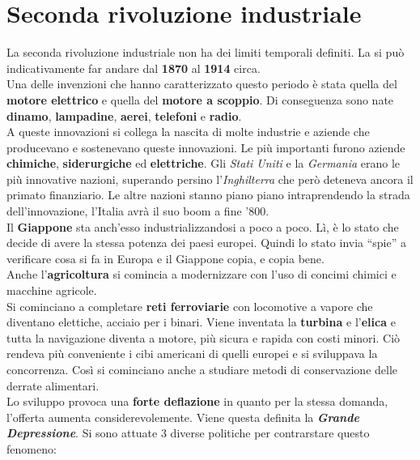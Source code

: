 
\section{Seconda rivoluzione industriale}
La seconda rivoluzione industriale non ha dei limiti temporali definiti. La si può indicativamente
far andare dal \textbf{1870} al \textbf{1914} circa.\\
Una delle invenzioni che hanno caratterizzato questo periodo è stata quella del \textbf{motore
elettrico} e quella del \textbf{motore a scoppio}. Di conseguenza sono nate \textbf{dinamo},
\textbf{lampadine}, \textbf{aerei}, \textbf{telefoni} e \textbf{radio}.\\
A queste innovazioni si collega la nascita di molte industrie e aziende che producevano e sostenevano
queste innovazioni. Le più importanti furono aziende \textbf{chimiche}, \textbf{siderurgiche} ed
\textbf{elettriche}. Gli \emph{Stati Uniti} e la \emph{Germania} erano le più innovative nazioni,
superando persino l'\emph{Inghilterra} che però deteneva ancora il primato finanziario. Le altre 
nazioni stanno piano piano intraprendendo la strada dell'innovazione, l'Italia avrà il suo boom a 
fine '800.\\ [\baselineskip]
Il \textbf{Giappone} sta anch'esso industrializzandosi a poco a poco. Lì, è lo stato che decide di 
avere la stessa potenza dei paesi europei. Quindi lo stato invia ``spie'' a verificare cosa si fa
in Europa e il Giappone copia, e copia bene.\\
Anche l'\textbf{agricoltura} si comincia a modernizzare con l'uso di concimi chimici e macchine
agricole.\\ [\baselineskip]
Si cominciano a completare \textbf{reti ferroviarie} con locomotive a vapore che diventano elettiche,
acciaio per i binari. Viene inventata la \textbf{turbina} e l'\textbf{elica} e tutta la navigazione
diventa a motore, più sicura e rapida con costi minori. Ciò rendeva più conveniente i cibi americani
di quelli europei e si sviluppava la concorrenza. Così si cominciano anche a studiare metodi di
conservazione delle derrate alimentari.\\ [\baselineskip]
Lo sviluppo provoca una \textbf{forte deflazione} in quanto per la stessa domanda, l'offerta aumenta
considerevolemente. Viene questa definita la \textbf{\textit{Grande Depressione}}. Si sono attuate
3 diverse politiche per contrarstare questo fenomeno:
